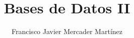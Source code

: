 
\title{Bases de Datos II}
\author{Francisco Javier Mercader Martínez}
\date{}


\maketitle

\thispagestyle{empty}

\tableofcontents

\thispagestyle{empty}

\newpage

\setcounter{page}{1}


